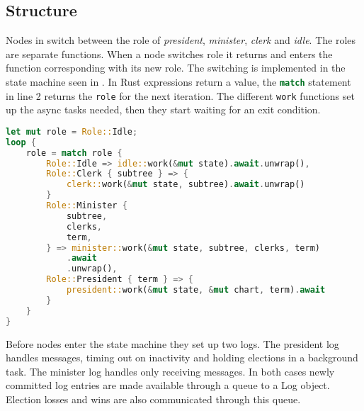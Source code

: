 \subsection{Structure}
Nodes in \name{} switch between the role of \textit{president}, \textit{minister}, \textit{clerk} and \textit{idle}. The roles are separate functions. When a node switches role it returns and enters the function corresponding with its new role. The switching is implemented in the state machine seen in . In Rust expressions return a value, the \lstinline[language=rust]{match} statement in line 2 returns the \lstinline[language=rust]{role} for the next iteration. The different \lstinline[language=rust]{work} functions set up the async tasks needed, then they start waiting for an exit condition.
%
\begin{lstlisting}[float,language=rust,style=boxed,tabsize=2,caption={The state machine switching between a nodes different roles},label=lst:state]
let mut role = Role::Idle;
loop {
	role = match role {
		Role::Idle => idle::work(&mut state).await.unwrap(),
		Role::Clerk { subtree } => {
			clerk::work(&mut state, subtree).await.unwrap()
		}
		Role::Minister {
			subtree,
			clerks,
			term,
		} => minister::work(&mut state, subtree, clerks, term)
			.await
			.unwrap(),
		Role::President { term } => {
			president::work(&mut state, &mut chart, term).await
		}
	}
}
\end{lstlisting}
\clearpage
%
Before nodes enter the state machine they set up two \raft{} logs. The president log handles messages, timing out on inactivity and holding elections in a background task. The minister log handles only receiving messages. In both cases newly committed log entries are made available through a queue to a \raft{} Log object. Election losses and wins are also communicated through this queue.

